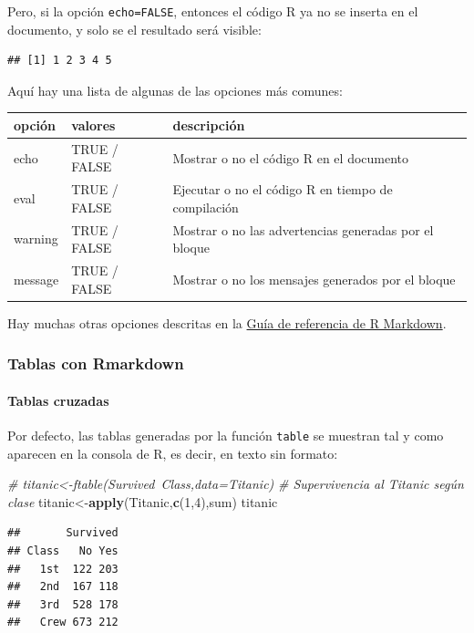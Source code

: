 \documentclass[]{article}
\newenvironment{Shaded}{\begin{snugshade}}{\end{snugshade}}
\newcommand{\CommentTok}[1]{\textcolor[rgb]{0.56,0.35,0.01}{\textit{#1}}}
\newcommand{\DecValTok}[1]{\textcolor[rgb]{0.00,0.00,0.81}{#1}}
\newcommand{\KeywordTok}[1]{\textcolor[rgb]{0.13,0.29,0.53}{\textbf{#1}}}
\newcommand{\NormalTok}[1]{#1}
\let\oldparagraph\paragraph
\renewcommand{\paragraph}[1]{\oldparagraph{#1}\mbox{}}
\numberwithin{ejcnt}{section}
\begin{document}
Pero, si la opción \texttt{echo=FALSE}, entonces el código R ya no se inserta en el documento, y solo se el resultado será visible:

\begin{verbatim}
## [1] 1 2 3 4 5
\end{verbatim}

Aquí hay una lista de algunas de las opciones más comunes:

\begin{longtable}[]{@{}lll@{}}
\toprule
opción & valores & descripción\tabularnewline
\midrule
\endhead
echo & TRUE / FALSE & Mostrar o no el código R en el documento\tabularnewline
eval & TRUE / FALSE & Ejecutar o no el código R en tiempo de compilación\tabularnewline
warning & TRUE / FALSE & Mostrar o no las advertencias generadas por el bloque\tabularnewline
message & TRUE / FALSE & Mostrar o no los mensajes generados por el bloque\tabularnewline
\bottomrule
\end{longtable}

Hay muchas otras opciones descritas en la \href{https://www.rstudio.com/wp-content/uploads/2015/03/rmarkdown-reference.pdf}{Guía de referencia de R Markdown}.

\hypertarget{tablas-con-rmarkdown}{%
\subsubsection{Tablas con Rmarkdown}\label{tablas-con-rmarkdown}}

\hypertarget{tablas-cruzadas}{%
\paragraph{Tablas cruzadas}\label{tablas-cruzadas}}

Por defecto, las tablas generadas por la función \texttt{table} se muestran tal y como aparecen en la consola de R, es decir, en texto sin formato:

\begin{Shaded}
\begin{Highlighting}[]
\CommentTok{# titanic<-ftable(Survived~Class,data=Titanic)}
\CommentTok{# Supervivencia al Titanic según clase}
\NormalTok{titanic<-}\KeywordTok{apply}\NormalTok{(Titanic,}\KeywordTok{c}\NormalTok{(}\DecValTok{1}\NormalTok{,}\DecValTok{4}\NormalTok{),sum)}
\NormalTok{titanic}
\end{Highlighting}
\end{Shaded}

\begin{verbatim}
##       Survived
## Class   No Yes
##   1st  122 203
##   2nd  167 118
##   3rd  528 178
##   Crew 673 212
\end{verbatim}
\end{document}
